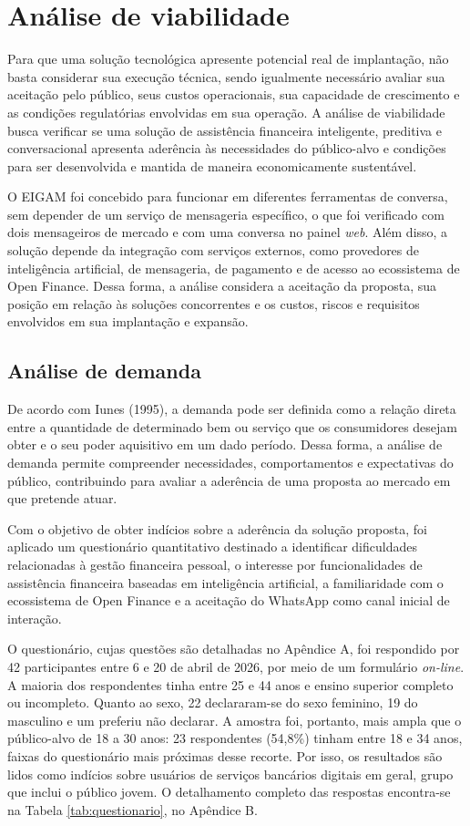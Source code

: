 \chapter{Análise de viabilidade}
\label{chap:viabilidade}

Para que uma solução tecnológica apresente potencial real de implantação, não basta considerar sua execução técnica, sendo igualmente necessário avaliar sua aceitação pelo público, seus custos operacionais, sua capacidade de crescimento e as condições regulatórias envolvidas em sua operação. A análise de viabilidade busca verificar se uma solução de assistência financeira inteligente, preditiva e conversacional apresenta aderência às necessidades do público-alvo e condições para ser desenvolvida e mantida de maneira economicamente sustentável.

O EIGAM foi concebido para funcionar em diferentes ferramentas de conversa, sem depender de um serviço de mensageria específico, o que foi verificado com dois mensageiros de mercado e com uma conversa no painel \textit{web}. Além disso, a solução depende da integração com serviços externos, como provedores de inteligência artificial, de mensageria, de pagamento e de acesso ao ecossistema de Open Finance. Dessa forma, a análise considera a aceitação da proposta, sua posição em relação às soluções concorrentes e os custos, riscos e requisitos envolvidos em sua implantação e expansão.
\section{Análise de demanda}

De acordo com Iunes (1995), a demanda pode ser definida como a relação direta entre a quantidade de determinado bem ou serviço que os consumidores desejam obter e o seu poder aquisitivo em um dado período. Dessa forma, a análise de demanda permite compreender necessidades, comportamentos e expectativas do público, contribuindo para avaliar a aderência de uma proposta ao mercado em que pretende atuar.

Com o objetivo de obter indícios sobre a aderência da solução proposta, foi aplicado um questionário quantitativo destinado a identificar dificuldades relacionadas à gestão financeira pessoal, o interesse por funcionalidades de assistência financeira baseadas em inteligência artificial, a familiaridade com o ecossistema de Open Finance e a aceitação do WhatsApp como canal inicial de interação.

O questionário, cujas questões são detalhadas no Apêndice A, foi respondido por 42 participantes entre 6 e 20 de abril de 2026, por meio de um formulário \textit{on-line}. A maioria dos respondentes tinha entre 25 e 44 anos e ensino superior completo ou incompleto. Quanto ao sexo, 22 declararam-se do sexo feminino, 19 do masculino e um preferiu não declarar. A amostra foi, portanto, mais ampla que o público-alvo de 18 a 30 anos: 23 respondentes (54,8\%) tinham entre 18 e 34 anos, faixas do questionário mais próximas desse recorte. Por isso, os resultados são lidos como indícios sobre usuários de serviços bancários digitais em geral, grupo que inclui o público jovem. O detalhamento completo das respostas encontra-se na Tabela \ref{tab:questionario}, no Apêndice B.

